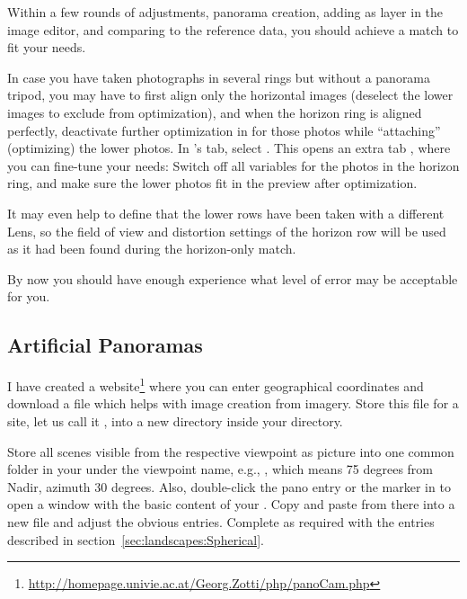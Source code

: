 Within a few rounds of adjustments, panorama creation, adding as layer
in the image editor, and comparing to the reference data, you should
achieve a match to fit your needs.

In case you have taken photographs in several rings but without a panorama tripod, you may have to
first align only the horizontal images (deselect the lower images to
exclude from optimization), and when the horizon ring is aligned
perfectly, deactivate further optimization in  for those photos
while ``attaching'' (optimizing) the lower photos. In 's  tab,
select . This opens an
extra tab , where you can fine-tune your needs: Switch
off all variables for the photos in the horizon ring, and make sure
the lower photos fit in the preview after optimization.

It may even help to define that the lower rows have been taken with a
different Lens, so the field of view and distortion settings of the
horizon row will be used as it had been found during the horizon-only
match.

By now you should have
enough experience what level of error may be acceptable for you.


\subsection{Artificial Panoramas}
\label{sec:landscapes:Artificial}

I have created a
website\footnote{\url{http://homepage.univie.ac.at/Georg.Zotti/php/panoCam.php}} where
you can enter geographical coordinates and download a file
  which helps with image creation from 
imagery. Store this file for a site, let us call it
, into a new directory  inside
your  directory.

Store all scenes visible from the respective viewpoint
 as picture into one common folder in your
 under the viewpoint name, e.g.,
, which means 75 degrees from Nadir, azimuth 30
degrees.  Also, double-click the pano entry or the marker in  to open a window with the
basic content of your . Copy and paste from there
into a new file  and adjust the obvious
entries. Complete as required with the entries described in
section~\ref{sec:landscapes:Spherical}.

